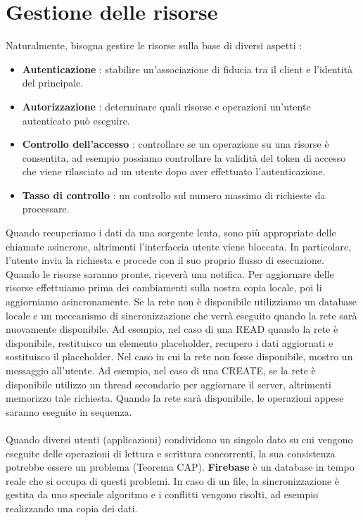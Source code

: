 \documentclass[12pt]{report}
\begin{document}
\section{Gestione delle risorse}
Naturalmente, bisogna gestire le risorse sulla base di diversi aspetti :
\begin{itemize}
\item \textbf{Autenticazione} : stabilire un'associazione di fiducia tra il client e l'identità del principale.
\item \textbf{Autorizzazione} : determinare quali risorse e operazioni un'utente autenticato può eseguire.
\item \textbf{Controllo dell'accesso} : controllare se un operazione su una risorse è consentita, ad esempio possiamo controllare la validità del token di accesso che viene rilasciato ad un utente dopo aver effettuato l'autenticazione.
\item \textbf{Tasso di controllo} : un controllo sul numero massimo di richieste da processare.
\end{itemize}
Quando recuperiamo i dati da una sorgente lenta, sono più appropriate delle chiamate asincrone, altrimenti l'interfaccia utente viene bloccata. In particolare, l'utente invia la richiesta e procede con il suo proprio flusso di esecuzione. Quando le risorse saranno pronte, riceverà una notifica. Per aggiornare delle risorse effettuiamo prima dei cambiamenti sulla nostra copia locale, poi li aggiorniamo asincronamente. Se la rete non è disponibile utilizziamo un database locale e un meccanismo di sincronizzazione che verrà eseguito quando la rete sarà nuovamente disponibile. Ad esempio, nel caso di una READ quando la rete è disponibile, restituisco un elemento placeholder, recupero i dati aggiornati e sostituisco il placeholder. Nel caso in cui la rete non fosse disponibile, mostro un messaggio all'utente. Ad esempio, nel caso di una CREATE, se la rete è disponibile utilizzo un thread secondario per aggiornare il server, altrimenti memorizzo tale richiesta. Quando la rete sarà disponibile, le operazioni appese saranno eseguite in sequenza.\\\\Quando diversi utenti (applicazioni) condividono un singolo dato su cui vengono eseguite delle operazioni di lettura e scrittura concorrenti, la sua consistenza potrebbe essere un problema (Teorema CAP). \textbf{Firebase} è un database in tempo reale che si occupa di questi problemi. In caso di un file, la sincronizzazione è gestita da uno speciale algoritmo e i conflitti vengono risolti, ad esempio realizzando una copia dei dati.
\end{document}
